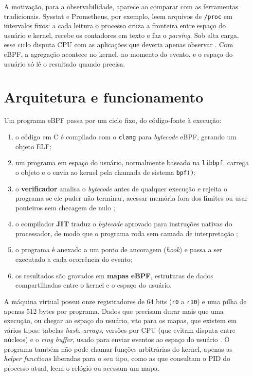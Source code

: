 A motivação, para a observabilidade, aparece ao comparar com as ferramentas tradicionais. Sysstat e Prometheus, por exemplo, leem arquivos de \texttt{/proc} em intervalos fixos: a cada leitura o processo cruza a fronteira entre espaço do usuário e kernel, recebe os contadores em texto e faz o \textit{parsing}. Sob alta carga, esse ciclo disputa CPU com as aplicações que deveria apenas observar \cite{cassagnes2020}. Com eBPF, a agregação acontece no kernel, no momento do evento, e o espaço do usuário só lê o resultado quando precisa.

\section{Arquitetura e funcionamento}

Um programa eBPF passa por um ciclo fixo, do código-fonte à execução:

\begin{enumerate}
  \item o código em C é compilado com o \texttt{clang} para \textit{bytecode} eBPF, gerando um objeto ELF;
  \item um programa em espaço do usuário, normalmente baseado na \texttt{libbpf}, carrega o objeto e o envia ao kernel pela chamada de sistema \texttt{bpf()};
  \item o \textbf{verificador} analisa o \textit{bytecode} antes de qualquer execução e rejeita o programa se ele puder não terminar, acessar memória fora dos limites ou usar ponteiros sem checagem de nulo \cite{linuxkernel2024};
  \item o compilador \textbf{JIT} traduz o \textit{bytecode} aprovado para instruções nativas do processador, de modo que o programa roda sem camada de interpretação \cite{gregg2019};
  \item o programa é anexado a um ponto de ancoragem (\textit{hook}) e passa a ser executado a cada ocorrência do evento;
  \item os resultados são gravados em \textbf{mapas eBPF}, estruturas de dados compartilhadas entre o kernel e o espaço do usuário.
\end{enumerate}

A máquina virtual possui onze registradores de 64 bits (\texttt{r0} a \texttt{r10}) e uma pilha de apenas 512 bytes por programa. Dados que precisam durar mais que uma execução, ou chegar ao espaço do usuário, vão para os mapas, que existem em vários tipos: tabelas \textit{hash}, \textit{arrays}, versões por CPU (que evitam disputa entre núcleos) e o \textit{ring buffer}, usado para enviar eventos ao espaço do usuário \cite{gregg2019}. O programa também não pode chamar funções arbitrárias do kernel, apenas as \textit{helper functions} liberadas para o seu tipo, como as que consultam o PID do processo atual, leem o relógio ou acessam um mapa.

